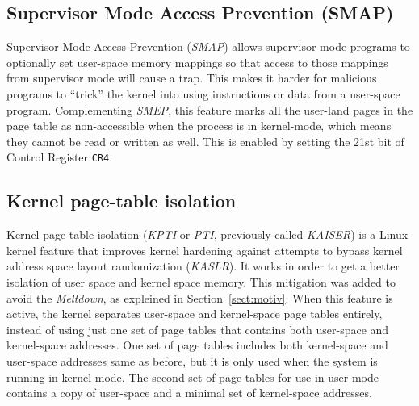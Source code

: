 \documentclass{masterthesis}
\newcommand{\refToSection}[1]{Section~\ref{sect:#1}\xspace}
\begin{document}
\subsection{Supervisor Mode Access Prevention (SMAP)}
\label{subsect:SMAP}
Supervisor Mode Access Prevention (\emph{SMAP}) allows supervisor mode programs to optionally set user-space memory mappings so that access to those mappings from supervisor mode will cause a trap. This makes it harder for malicious programs to ``trick'' the kernel into using instructions or data from a user-space program.
Complementing \emph{SMEP}, this feature marks all the user-land pages in the page table as non-accessible when the process is in kernel-mode, which means they cannot be read or written as well. This is enabled by setting the 21st bit of Control Register \texttt{CR4}.

\subsection{Kernel page-table isolation}
\label{subsect:KPTI}
Kernel page-table isolation (\emph{KPTI} or \emph{PTI}, previously called \emph{KAISER}) is a Linux kernel feature that improves kernel hardening against attempts to bypass kernel address space layout randomization (\emph{KASLR}). It works in order to get a better isolation of user space and kernel space memory.
This mitigation was added to avoid the \emph{Meltdown}, as expleined in \refToSection{motiv}.
When this feature is active, the kernel separates user-space and kernel-space page tables entirely, instead of using just one set of page tables that contains both user-space and kernel-space addresses. One set of page tables includes both kernel-space and user-space addresses same as before, but it is only used when the system is running in kernel mode. The second set of page tables for use in user mode contains a copy of user-space and a minimal set of kernel-space addresses.
\end{document}
